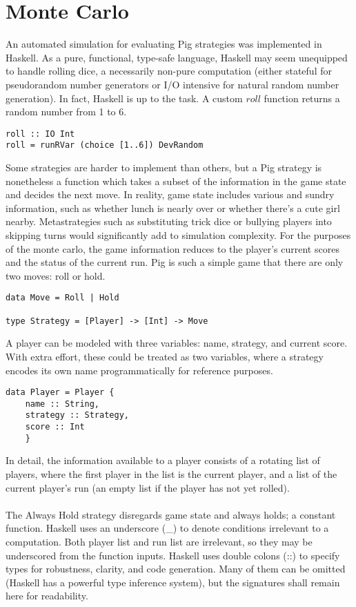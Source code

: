 \documentclass{article}
\begin{document}
\section*{Monte Carlo}
An automated simulation for evaluating Pig strategies was implemented in Haskell. As a pure, functional, type-safe language, Haskell may seem unequipped to handle rolling dice, a necessarily non-pure computation (either stateful for pseudorandom number generators or I/O intensive for natural random number generation). In fact, Haskell is up to the task. A custom $roll$ function returns a random number from 1 to 6.
\begin{verbatim}
roll :: IO Int
roll = runRVar (choice [1..6]) DevRandom
\end{verbatim}
Some strategies are harder to implement than others, but a Pig strategy is nonetheless a function which takes a subset of the information in the game state and decides the next move. In reality, game state includes various and sundry information, such as whether lunch is nearly over or whether there's a cute girl nearby. Metastrategies such as substituting trick dice or bullying players into skipping turns would significantly add to simulation complexity. For the purposes of the monte carlo, the game information reduces to the player's current scores and the status of the current run. Pig is such a simple game that there are only two moves: roll or hold.
\begin{verbatim}
data Move = Roll | Hold

type Strategy = [Player] -> [Int] -> Move
\end{verbatim}
A player can be modeled with three variables: name, strategy, and current score. With extra effort, these could be treated as two variables, where a strategy encodes its own name programmatically for reference purposes.
\begin{verbatim}
data Player = Player {
    name :: String,
    strategy :: Strategy,
    score :: Int
    }
\end{verbatim}
In detail, the information available to a player consists of a rotating list of players, where the first player in the list is the current player, and a list of the current player's run (an empty list if the player has not yet rolled).
\\\\
The Always Hold strategy disregards game state and always holds; a constant function. Haskell uses an underscore (\_) to denote conditions irrelevant to a computation. Both player list and run list are irrelevant, so they may be underscored from the function inputs. Haskell uses double colons (::) to specify types for robustness, clarity, and code generation. Many of them can be omitted (Haskell has a powerful type inference system), but the signatures shall remain here for readability.
\end{document}
